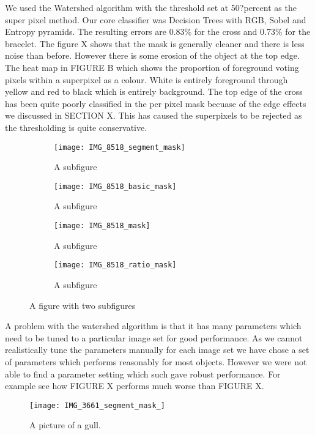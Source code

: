 \documentclass[12pt]{IIBproject}
\begin{document}
We used the Watershed algorithm with the threshold set at 50?percent as the super pixel method. Our core classifier was Decision Trees with RGB, Sobel and Entropy pyramids. The resulting errors are 0.83\% for the cross and 0.73\% for the bracelet. The figure X shows that the mask is generally cleaner and there is less noise than before. However there is some erosion of the object at the top edge. The heat map in FIGURE B which shows the proportion of foreground voting pixels within a superpixel as a colour. White is entirely foreground through yellow and red to black which is entirely background. The top edge of the cross has been quite poorly classified in the per pixel mask becuase of the edge effects we discussed in SECTION X. This has caused the superpixels to be rejected as the thresholding is quite conservative.
\begin{figure}[H]
\centering
\begin{subfigure}{.45\textwidth}
  \centering
  \texttt{[image: IMG\_8518\_segment\_mask]}
  \caption{A subfigure}
  \label{fig:sub1}
\end{subfigure}%
\begin{subfigure}{.45\textwidth}
  \centering
  \texttt{[image: IMG\_8518\_basic\_mask]}
  \caption{A subfigure}
  \label{fig:sub2}
\end{subfigure}
\begin{subfigure}{.45\textwidth}
  \centering
  \texttt{[image: IMG\_8518\_mask]}
  \caption{A subfigure}
  \label{fig:sub2}
\end{subfigure}
\begin{subfigure}{.45\textwidth}
  \centering
  \texttt{[image: IMG\_8518\_ratio\_mask]}
  \caption{A subfigure}
  \label{fig:sub2}
\end{subfigure}
\caption{A figure with two subfigures}
\label{fig:test}
\end{figure}


A problem with the watershed algorithm is that it has many parameters which need to be tuned to a particular image set for good performance. As we cannot realistically tune the parameters manually for each image set we have chose a set of parameters which performs reasonably for most objects. However we were not able to find a parameter setting which such gave robust performance. For example see how FIGURE X performs much worse than FIGURE X.

\begin{figure}[H]
  \caption{A picture of a gull.}
  \centering
    \texttt{[image: IMG\_3661\_segment\_mask\_]}
\end{figure}
\end{document}
